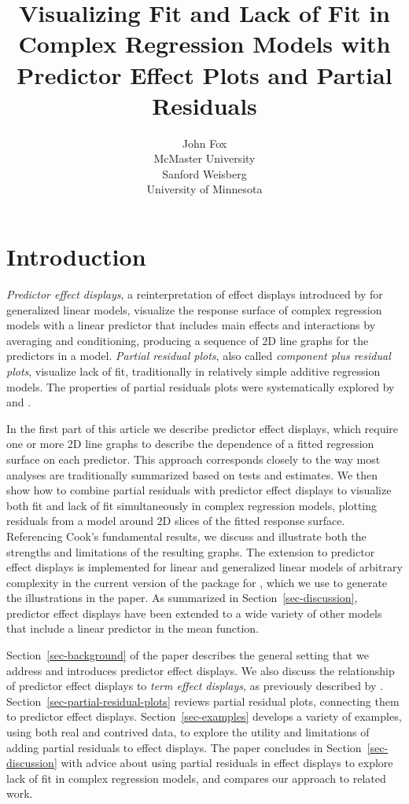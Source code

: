 \documentclass[article]{jss}
\author{John Fox\\McMaster University\\ \And
        Sanford Weisberg\\University of Minnesota}
\title{Visualizing Fit and Lack of Fit in Complex Regression Models with Predictor Effect Plots and Partial Residuals}
\begin{document}
\section{Introduction}

\emph{Predictor effect displays}, a reinterpretation of effect
displays introduced by \citet{Fox87} for generalized linear models,
visualize the response surface of complex regression models with a
linear predictor that includes main effects and interactions by
averaging and conditioning, producing a sequence of 2D line graphs for
the predictors in a model.  \emph{Partial residual plots}, also called
\emph{component plus residual plots}, visualize lack of fit,
traditionally in relatively simple additive regression models. The
properties of partial residuals plots were systematically explored by
\citet{Cook93} and \citet{CookCroos98}.

In the first part of this article we describe predictor effect
displays, which require one or more 2D line graphs to describe the
dependence of a fitted regression surface on each predictor.  This
approach corresponds closely to the way most analyses are
traditionally summarized based on tests and estimates. We then show
how to combine partial residuals with predictor effect displays to
visualize both fit and lack of fit simultaneously in complex
regression models, plotting residuals from a model around 2D slices of
the fitted response surface. Referencing Cook's fundamental results,
we discuss and illustrate both the strengths and limitations of the
resulting graphs. The extension to predictor effect displays is
implemented for linear and generalized linear models of arbitrary
complexity in the current version of the  package for
 \citep{Fox03, effects2, FoxEtAl16}, which we use to generate the
illustrations in the paper.  As summarized in
Section~\ref{sec-discussion}, predictor effect displays have been
extended to a wide variety of other models that include a linear
predictor in the mean function.

Section~\ref{sec-background} of the paper describes the general
setting that we address and introduces predictor effect displays.  We
also discuss the relationship of predictor effect displays to
\emph{term effect displays}, as previously described by \citet{Fox87}.
Section~\ref{sec-partial-residual-plots} reviews partial residual
plots, connecting them to predictor effect displays.
Section~\ref{sec-examples} develops a variety of examples, using both
real and contrived data, to explore the utility and limitations of
adding partial residuals to effect displays. The paper concludes in
Section~\ref{sec-discussion} with advice about using partial residuals
in effect displays to explore lack of fit in complex regression
models, and compares our approach to related work.
\end{document}
